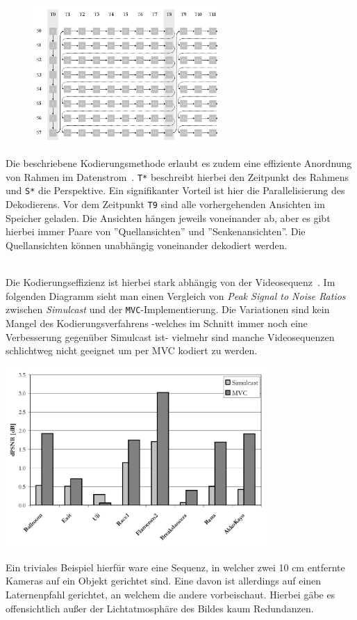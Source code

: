 
\begin{figure}
    \includegraphics[width=7cm]{../img/encoding-memory}
\end{figure}

Die beschriebene Kodierungsmethode erlaubt es zudem eine effiziente Anordnung von Rahmen im Datenstrom~\cite{paper}.
\texttt{T*} beschreibt hierbei den Zeitpunkt des Rahmens und \texttt{S*} die Perspektive.
Ein signifikanter Vorteil ist hier die Parallelisierung des Dekodierens.
Vor dem Zeitpunkt \texttt{T9} sind alle vorhergehenden Ansichten im Speicher geladen.
Die Ansichten h\"angen jeweils voneinander ab, aber es gibt hierbei immer Paare von ''Quellansichten'' und
''Senkenansichten''.
Die Quellansichten k\"onnen unabh\"angig voneinander dekodiert werden.

\noindent\\ Die Kodierungseffizienz ist hierbei stark abh\"angig von der Videosequenz~\cite{paper}.
Im folgenden Diagramm sieht man einen Vergleich von \textit{Peak Signal to Noise Ratios} zwischen \textit{Simulcast}
und der \texttt{MVC}-Implementierung.
Die Variationen sind kein Mangel des Kodierungsverfahrens -welches im Schnitt immer noch eine Verbesserung gegen\"uber
Simulcast ist- vielmehr sind manche Videosequenzen schlichtweg nicht geeignet um per MVC kodiert zu werden.

\begin{center}
    \includegraphics[width=0.75\textwidth]{../img/encoding-efficiency}
\end{center}
\noindent Ein triviales Beispiel hierf\"ur ware eine Sequenz, in welcher zwei 10 cm entfernte Kameras auf ein Objekt
gerichtet sind.
Eine davon ist allerdings auf einen Laternenpfahl gerichtet, an welchem die andere vorbeischaut.
Hierbei g\"abe es offensichtlich au{\ss}er der Lichtatmosph\"are des Bildes kaum Redundanzen.
